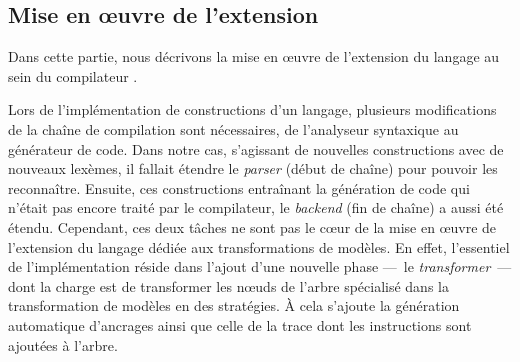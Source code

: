 \subsection{Mise en œuvre de l'extension}
\label{subsec:meoExt}

Dans cette partie, nous décrivons la mise en œuvre de l'extension du langage au
sein du compilateur {\tom}. %


Lors de l'implémentation de constructions d'un langage, plusieurs modifications
de la chaîne de compilation sont nécessaires, de l'analyseur syntaxique au
générateur de code. Dans notre cas, s'agissant de nouvelles constructions avec
de nouveaux lexèmes, il fallait étendre le \emph{parser} (début de chaîne) pour
pouvoir les reconnaître. Ensuite, ces constructions entraînant la génération de
code qui n'était pas encore traité par le compilateur, le \emph{backend} (fin
de chaîne) a aussi été étendu. Cependant, ces deux tâches ne sont pas le cœur
de la mise en œuvre de l'extension du langage dédiée aux transformations de
modèles. En effet, l'essentiel de l'implémentation réside dans l'ajout d'une
nouvelle phase ---~le \emph{transformer}~--- dont la charge est de transformer
les nœuds de l'arbre spécialisé dans la transformation de modèles en des
stratégies. À cela s'ajoute la génération automatique d'ancrages ainsi que
celle de la trace dont les instructions sont ajoutées à l'arbre.


